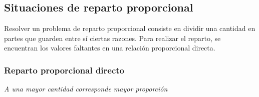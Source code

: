 \documentclass[11pt]{book}
\newenvironment{mybox}[3][]{%
  \begin{tikzpicture}[#1]%
    \def\myboxname{#3}%
    \node [draw, inner sep=2ex,  align=justify]
      (BOXCONTENT) \bgroup\rule{0ex}{0ex}\ignorespaces
  }{%
    \egroup;
    \node [right, inner sep=3pt, fill=colorrds!75, outer sep=0pt, 
      text height=2ex, text depth=.5ex] (BOXNAME) 
      at ([shift={(-1em,5pt)}]BOXCONTENT.north west) {\myboxname};
    \fill[colorrds] (BOXNAME.north east) -- +(-1em,1em)
      -- +(-1em,0) -- cycle;
    \fill[colorrds] (BOXNAME.south west) -- +(1em,-1em)
      -- +(1em,0) -- cycle;
  \end{tikzpicture}
}
\begin{document}
\subsection{Situaciones de reparto proporcional}

\begin{boxH}
  Resolver un problema de reparto proporcional consiste en dividir una cantidad en partes que guarden entre sí
  ciertas razones. Para realizar el reparto, se encuentran los valores faltantes en una relación proporcional directa.
\end{boxH}
\subsubsection{Reparto proporcional directo}
\emph{A una mayor cantidad corresponde mayor proporción}
\end{document}
